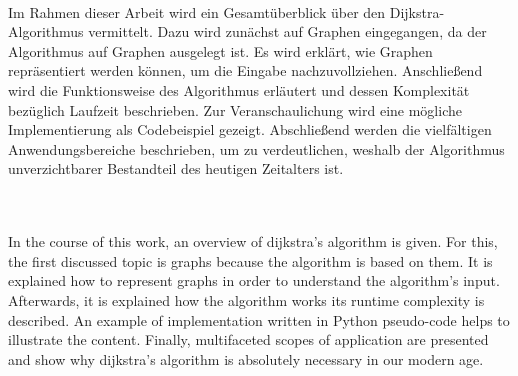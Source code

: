 \kurzfassung

\paragraph*{}


Im Rahmen dieser Arbeit wird ein Gesamtüberblick über den Dijkstra-Algorithmus vermittelt.
Dazu wird zunächst auf Graphen eingegangen, da der Algorithmus auf Graphen ausgelegt ist. Es wird erklärt, wie Graphen repräsentiert werden können, um die Eingabe nachzuvollziehen.
Anschließend wird die Funktionsweise des Algorithmus erläutert und dessen Komplexität bezüglich Laufzeit  beschrieben. Zur Veranschaulichung wird eine mögliche Implementierung als Codebeispiel gezeigt.
Abschließend werden die vielfältigen Anwendungsbereiche beschrieben, um zu verdeutlichen, weshalb der Algorithmus unverzichtbarer Bestandteil des heutigen Zeitalters ist. 

\\
\\
In the course of this work, an overview of dijkstra's algorithm is given.
For this, the first discussed topic is graphs because the algorithm is based on them. It is explained how to represent graphs in order to understand the algorithm's input.
Afterwards, it is explained how the algorithm works its runtime complexity is described. An example of implementation written in Python pseudo-code helps to illustrate the content.
Finally, multifaceted scopes of application are presented and show why dijkstra's algorithm is absolutely necessary in our modern age.
